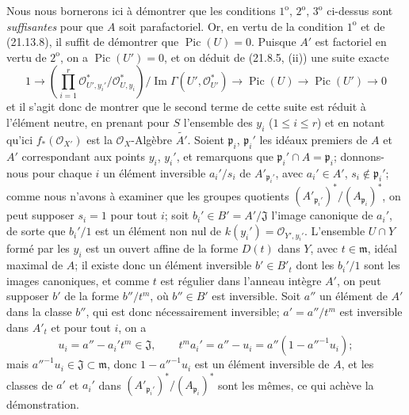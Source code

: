 Nous nous bornerons ici à démontrer que les conditions $1^{\mathrm o}$,
$2^{\mathrm o}$, $3^{\mathrm o}$ ci-dessus sont \emph{suffisantes} pour que $A$ soit
parafactoriel. Or, en vertu de la condition $1^{\mathrm o}$ et de (21.13.8), il suffit
de démontrer que $\operatorname{Pic}(U)=0$. Puisque $A'$ est factoriel en vertu de
$2^{\mathrm o}$, on a $\operatorname{Pic}(U')=0$, et on déduit de (21.8.5, (ii)) une
suite exacte
\[
  1\longrightarrow
  \left(\prod_{i=1}^r
  \mathcal O_{U',y_i'}^*/\mathcal O_{U,y_i}^*\right)
  \big/\operatorname{Im}\Gamma(U',\mathcal O_{U'}^*)
  \longrightarrow\operatorname{Pic}(U)\longrightarrow\operatorname{Pic}(U')
  \longrightarrow0
\]
et il s'agit donc de montrer que le second terme de cette suite est réduit à l'élément
neutre, en prenant pour $S$ l'ensemble des $y_i$ ($1\leq i\leq r$) et en notant
qu'ici $f_*(\mathcal O_{X'})$ est la $\mathcal O_X$-Algèbre $\widetilde{A'}$. Soient
$\mathfrak p_i$, $\mathfrak p_i'$ les idéaux premiers de $A$ et $A'$ correspondant
aux points $y_i$, $y_i'$, et remarquons que $\mathfrak p_i'\cap A=\mathfrak p_i$;
donnons-nous pour chaque $i$ un élément inversible $a_i'/s_i$ de
$A'_{\mathfrak p_i'}$, avec $a_i'\in A'$, $s_i\notin\mathfrak p_i'$; comme nous
n'avons à examiner que les groupes quotients
$(A'_{\mathfrak p_i'})^*/(A_{\mathfrak p_i})^*$, on peut supposer $s_i=1$ pour tout
$i$; soit $b_i'\in B'=A'/\mathfrak J$ l'image canonique de $a_i'$, de sorte que
$b_i'/1$ est un élément non nul de $k(y_i')=\mathcal O_{Y',y_i'}$. L'ensemble
$U\cap Y$ formé par les $y_i$ est un ouvert affine de la forme $D(t)$ dans $Y$, avec
$t\in\mathfrak m$, idéal maximal de $A$; il existe donc un élément inversible
$b'\in B'_t$ dont les $b_i'/1$ sont les images canoniques, et comme $t$ est régulier
dans l'anneau intègre $A'$, on peut supposer $b'$ de la forme $b''/t^m$, où
$b''\in B'$ est inversible. Soit $a''$ un élément de $A'$ dans la classe $b''$, qui
est donc nécessairement inversible; $a'=a''/t^m$ est inversible dans $A'_t$ et pour
tout $i$, on a
\[
  u_i=a''-a_i't^m\in\mathfrak J,
  \qquad
  t^m a_i'=a''-u_i=a''(1-a''^{-1}u_i);
\]
mais $a''^{-1}u_i\in\mathfrak J\subset\mathfrak m$, donc $1-a''^{-1}u_i$ est un
élément inversible de $A$, et les classes de $a'$ et $a_i'$ dans
$(A'_{\mathfrak p_i'})^*/(A_{\mathfrak p_i})^*$ sont les mêmes, ce qui achève la
démonstration.


